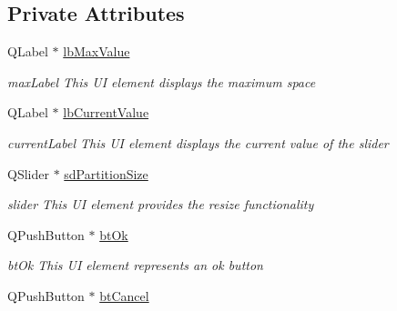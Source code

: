 \subsection*{Private Attributes}
\begin{DoxyCompactItemize}
\item 
\mbox{\label{class_resize_partition_af02b7002b295d281458663bcad0b5c57}} 
Q\+Label $\ast$ \mbox{\hyperlink{class_resize_partition_af02b7002b295d281458663bcad0b5c57}{lb\+Max\+Value}}
\begin{DoxyCompactList}\small\item\em max\+Label This UI element displays the maximum space \end{DoxyCompactList}\item 
\mbox{\label{class_resize_partition_a5f7c014c1d0609a95f63cd5b8f16892a}} 
Q\+Label $\ast$ \mbox{\hyperlink{class_resize_partition_a5f7c014c1d0609a95f63cd5b8f16892a}{lb\+Current\+Value}}
\begin{DoxyCompactList}\small\item\em current\+Label This UI element displays the current value of the slider \end{DoxyCompactList}\item 
\mbox{\label{class_resize_partition_a96b899e1a0da62fb92f6505bb4a65c4a}} 
Q\+Slider $\ast$ \mbox{\hyperlink{class_resize_partition_a96b899e1a0da62fb92f6505bb4a65c4a}{sd\+Partition\+Size}}
\begin{DoxyCompactList}\small\item\em slider This UI element provides the resize functionality \end{DoxyCompactList}\item 
\mbox{\label{class_resize_partition_a00eb95ec3a5ab346dab55be700b9fe0a}} 
Q\+Push\+Button $\ast$ \mbox{\hyperlink{class_resize_partition_a00eb95ec3a5ab346dab55be700b9fe0a}{bt\+Ok}}
\begin{DoxyCompactList}\small\item\em bt\+Ok This UI element represents an ok button \end{DoxyCompactList}\item 
\mbox{\label{class_resize_partition_a735e445b0178e35133c625a91684de1c}} 
Q\+Push\+Button $\ast$ \mbox{\hyperlink{class_resize_partition_a735e445b0178e35133c625a91684de1c}{bt\+Cancel}}

\end{DoxyCompactItemize}
